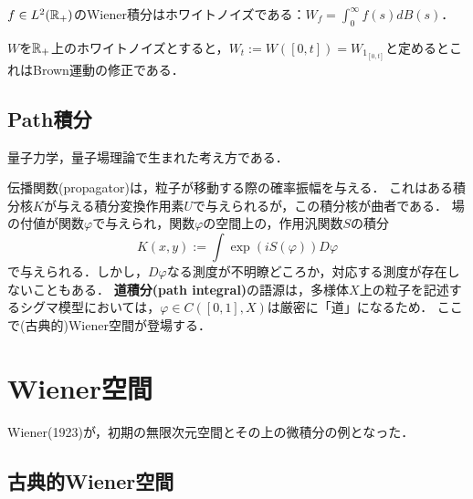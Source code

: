 \documentclass[uplatex,dvipdfmx]{jsreport}
\begin{document}
\begin{proposition}
    $f\in L^2(\mathbb{R}_+)$のWiener積分はホワイトノイズである：$W_f=\int^\infty_0f(s)dB(s)$．
\end{proposition}

\begin{proposition}
    $W$を$\mathbb{R}_+$上のホワイトノイズとすると，$W_t:=W([0,t])=W_{1_{[0,t]}}$と定めるとこれはBrown運動の修正である．
\end{proposition}


\subsection{Path積分}

\begin{tcolorbox}[colframe=ForestGreen, colback=ForestGreen!10!white,breakable,colbacktitle=ForestGreen!40!white,coltitle=black,fonttitle=\bfseries\sffamily,
title=]
    量子力学，量子場理論で生まれた考え方である．
\end{tcolorbox}

\begin{discussion}
    伝播関数(propagator)は，粒子が移動する際の確率振幅を与える．
    これはある積分核$K$が与える積分変換作用素$U$で与えられるが，この積分核が曲者である．
    場の付値が関数$\varphi$で与えられ，関数$\varphi$の空間上の，作用汎関数$S$の積分
    \[K(x,y):=\int\exp(iS(\varphi))D\varphi\]
    で与えられる．しかし，$D\varphi$なる測度が不明瞭どころか，対応する測度が存在しないこともある．
    \textbf{道積分(path integral)}の語源は，多様体$X$上の粒子を記述するシグマ模型においては，$\varphi\in C([0,1],X)$は厳密に「道」になるため．
    ここで(古典的)Wiener空間が登場する．
\end{discussion}

\section{Wiener空間}

\begin{tcolorbox}[colframe=ForestGreen, colback=ForestGreen!10!white,breakable,colbacktitle=ForestGreen!40!white,coltitle=black,fonttitle=\bfseries\sffamily,
title=]
    Wiener(1923)が，初期の無限次元空間とその上の微積分の例となった．
\end{tcolorbox}

\subsection{古典的Wiener空間}
\end{document}
